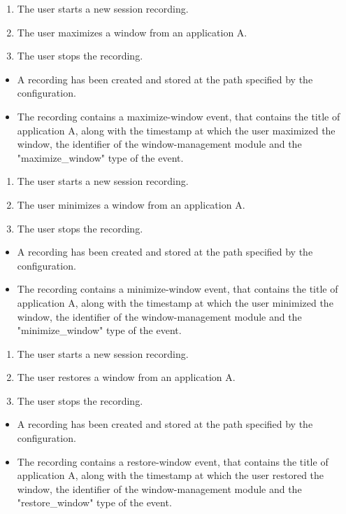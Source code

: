 \begin{tests}
	{\begin{enumerate}
		\item The user starts a new session recording.
		\item The user maximizes a window from an application A.
		\item The user stops the recording.
	\end{enumerate}}
	{\begin{itemize}
		\item A recording has been created and stored at the path specified by the configuration.
		\item The recording contains a maximize-window event, that contains the title of application A, along with the timestamp at which the user maximized the window, the identifier of the window-management module and the "maximize_window" type of the event.
	\end{itemize}}
	
	{\begin{enumerate}
		\item The user starts a new session recording.
		\item The user minimizes a window from an application A.
		\item The user stops the recording.
	\end{enumerate}}
	{\begin{itemize}
		\item A recording has been created and stored at the path specified by the configuration.
		\item The recording contains a minimize-window event, that contains the title of application A, along with the timestamp at which the user minimized the window, the identifier of the window-management module and the "minimize_window" type of the event.
	\end{itemize}}
	
	{\begin{enumerate}
		\item The user starts a new session recording.
		\item The user restores a window from an application A.
		\item The user stops the recording.
	\end{enumerate}}
	{\begin{itemize}
		\item A recording has been created and stored at the path specified by the configuration.
		\item The recording contains a restore-window event, that contains the title of application A, along with the timestamp at which the user restored the window, the identifier of the window-management module and the "restore_window" type of the event.
	\end{itemize}}	
\end{tests}



